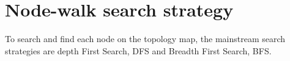 \documentclass[conference]{IEEEtran}
\begin{document}




\section{Node-walk search strategy}
To search and find each node on the topology map, the mainstream search strategies are depth First Search, DFS and Breadth First Search, BFS.
\end{document}
